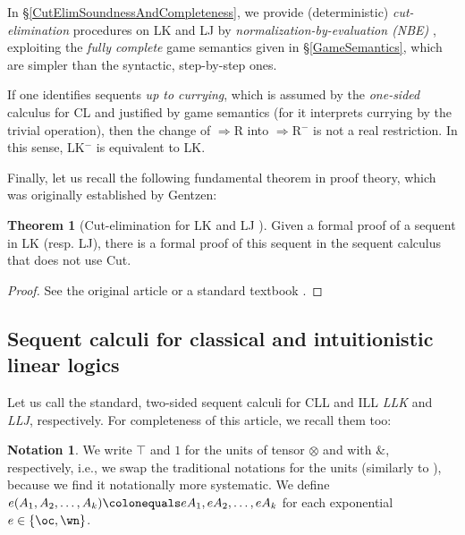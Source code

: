 \documentclass[a4paper]{article}
\theoremstyle{definition}
\newtheorem{notation}[definition]{Notation}
\theoremstyle{theorem}
\newtheorem{theorem}[definition]{Theorem}
\theoremstyle{remark}
\begin{document}
In \S\ref{CutElimSoundnessAndCompleteness}, we provide (deterministic) \emph{cut-elimination} procedures \cite{troelstra2000basic} on LK and LJ by \emph{normalization-by-evaluation (NBE)} \cite{berger1991inverse}, exploiting the \emph{fully complete} game semantics given in \S\ref{GameSemantics}, which are simpler than the syntactic, step-by-step ones.
\fi

If one identifies sequents \emph{up to currying}, which is assumed by the \emph{one-sided} calculus for CL \cite{troelstra2000basic} and justified by game semantics (for it interprets currying by the trivial operation), then the change of $\Rightarrow$R into $\Rightarrow$R$^-$ is not a real restriction.
In this sense, LK$^-$ is equivalent to LK.
\fi

Finally, let us recall the following fundamental theorem in proof theory, which was originally established by Gentzen:
\begin{theorem}[Cut-elimination for \textsf{LK} and \textsf{LJ} \cite{gentzen1935untersuchungen,troelstra2000basic}]
\label{ThmCutEliminationForLKAndLJ}
Given a formal proof of a sequent in \textsf{LK} (resp. \textsf{LJ}), there is a formal proof of this sequent in the sequent calculus that does not use Cut.
\end{theorem}
\begin{proof}
See the original article \cite{gentzen1935untersuchungen} or a standard textbook \cite[\S4.1]{troelstra2000basic}.
\end{proof}











\subsection{Sequent calculi for classical and intuitionistic linear logics}
\label{LinearLogics}
Let us call the standard, two-sided sequent calculi for CLL and ILL \cite{girard1987linear,troelstra2000basic} \emph{\textsf{LLK}} and \emph{\textsf{LLJ}}, respectively.
For completeness of this article, we recall them too:

\begin{notation}
We write $\top$ and $1$ for the units of tensor $\otimes$ and with $\&$, respectively, i.e., we swap the traditional notations for the units \cite{girard1987linear} (similarly to \cite[\S 2.7]{troelstra1991lectures}), because we find it notationally more systematic.
We define $e (A_1, A_2, \dots, A_k) \colonequals e A_1, e A_2, \dots, e A_k$ for each exponential $e \in \{ \oc, \wn \}$.
\end{notation}
\end{document}
